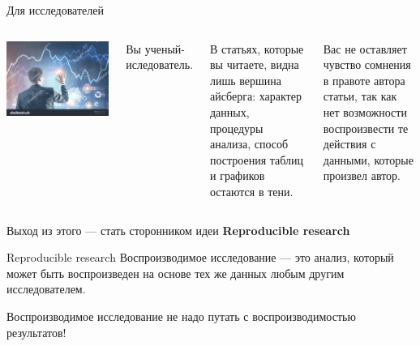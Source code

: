 \documentclass[
  10pt,
  ignorenonframetext,
  aspectratio=169,t,xcolor=table]{beamer}
\newcommand{\columnsbegin}{\vspace{-0.5\baselineskip}\begin{columns}[t,onlytextwidth]}
\newcommand{\columnsend}{\end{columns}}
\begin{document}
\begin{frame}{Для исследователей}
\protect\hypertarget{ux434ux43bux44f-ux438ux441ux441ux43bux435ux434ux43eux432ux430ux442ux435ux43bux435ux439}{}
\columnsbegin
{}

\includegraphics[height=0.6\textheight,keepaspectratio]{./images/stock-photo-businessman-interacting-with-a-hud-interface-against-a-blurred-blue-background-graphs-toned-image-1017564916.jpg}


Вы ученый-иследователь.

В статьях, которые вы читаете, видна лишь вершина айсберга: характер
данных, процедуры анализа, способ построения таблиц и графиков остаются
в тени.

Вас не оставляет чувство сомнения в правоте автора статьи, так как нет
возможности воспроизвести те действия с данными, которые произвел автор.

\columnsend

\centering

Выход из этого --- стать сторонником идеи \textbf{Reproducible research}
\end{frame}

\begin{frame}{Reproducible research}
\protect\hypertarget{reproducible-research}{}
Воспроизводимое исследование --- это анализ, который может быть
воспроизведен на основе тех же данных любым другим исследователем.

Воспроизводимое исследование не надо путать с воспроизводимостью
результатов!
\end{frame}
\end{document}
